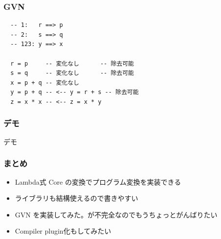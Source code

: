 \documentclass[cjk,dvipdfm,14pt]{beamer}
\begin{document}
\begin{frame}[fragile]
\frametitle{GVN}

\begin{lstlisting}
  -- 1:   r ==> p
  -- 2:   s ==> q
  -- 123: y ==> x

  r = p     -- 変化なし      -- 除去可能
  s = q     -- 変化なし      -- 除去可能
  x = p + q -- 変化なし
  y = p + q -- <-- y = r + s -- 除去可能
  z = x * x -- <-- z = x * y
\end{lstlisting}

\end{frame}


\begin{frame}[fragile]
\frametitle{デモ}

{ \Huge デモ }

\end{frame}

\begin{frame}[fragile]
\frametitle{まとめ}

\begin{itemize}
\item Lambda式 Core の変換でプログラム変換を実装できる
\item ライブラリも結構使えるので書きやすい
\item GVN を実装してみた。が不完全なのでもうちょっとがんばりたい
\item Compiler plugin化もしてみたい
\end{itemize}

\end{frame}
\end{document}

